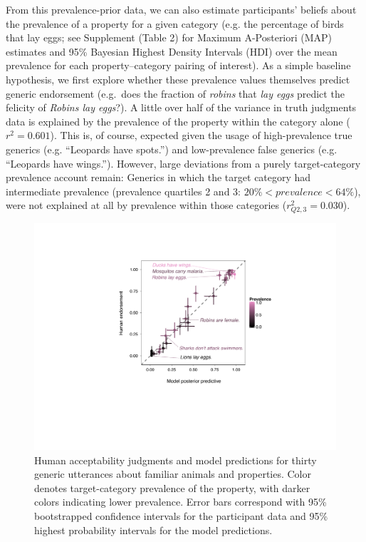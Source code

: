 \documentclass[10pt,letterpaper]{article}
\begin{document}
From this prevalence-prior data, we can also estimate participants' beliefs about the prevalence of a property for a given category (e.g. the percentage of birds that lay eggs; see Supplement (Table 2) for Maximum A-Posteriori (MAP) estimates and 95\% Bayesian Highest Density Intervals (HDI) over the mean prevalence for each property--category pairing of interest). %
As a simple baseline hypothesis, we first explore whether these prevalence values themselves predict generic endorsement (e.g.~does the fraction of \emph{robins} that \emph{lay eggs} predict the felicity of \emph{Robins lay eggs}?).
A little over half of the variance in truth judgments data is explained by the prevalence of the property within the category alone ($r^2 = 0.601$). 
This is, of course, expected given the usage of high-prevalence true generics (e.g. ``Leopards have spots.'') and low-prevalence false generics (e.g. ``Leopards have wings.''). 
However, large deviations from a purely target-category prevalence account remain: Generics in which the target category had intermediate prevalence (prevalence quartiles 2 and 3: $ 20\% < prevalence < 64\%$), were not explained at all by prevalence within those categories ($r_{Q2,3}^2 = 0.030$).

\begin{figure}
\centering
    \includegraphics[width=0.6\columnwidth]{truthjudge-scatter-wLabels.pdf}
    \caption{Human acceptability judgments and model predictions for thirty generic utterances about familiar animals and properties. 
    Color denotes target-category prevalence of the property, with darker colors indicating lower prevalence. 
    Error bars correspond with 95\% bootstrapped confidence intervals for the participant data and 95\% highest probability intervals for the model predictions.
    }
  \label{fig:modeldataBars}
\end{figure}

\end{document}
